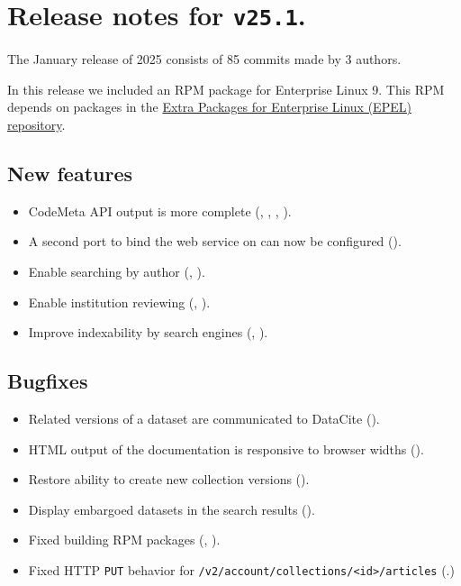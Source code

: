 \section*{Release notes for \texttt{v25.1}.}

  The January release of 2025 consists of 85 commits made by 3 authors.

  In this release we included an RPM package for Enterprise Linux 9.  This RPM
  depends on packages in the \href{https://docs.fedoraproject.org/en-US/epel/}%
  {Extra Packages for Enterprise Linux (EPEL) repository}.

\subsection*{New features}
\begin{itemize}
  \item{CodeMeta API output is more complete
      (,
      ,
      ,
      ).}
  \item{A second port to bind the web service on can now be configured
      ().}
  \item{Enable searching by author (,
      ).}
  \item{Enable institution reviewing (,
      ).}
  \item{Improve indexability by search engines
      (,
      ).}
\end{itemize}
\subsection*{Bugfixes}
\begin{itemize}
  \item{Related versions of a dataset are communicated to DataCite
      ().}
  \item{HTML output of the documentation is responsive to browser widths
      ().}
  \item{Restore ability to create new collection versions
      ().}
  \item{Display embargoed datasets in the search results
      ().}
  \item{Fixed building RPM packages (,
      ).}
  \item{Fixed HTTP \texttt{PUT} behavior for \texttt{/v2/account/collections/<id>/articles}
      (.)}
\end{itemize}
